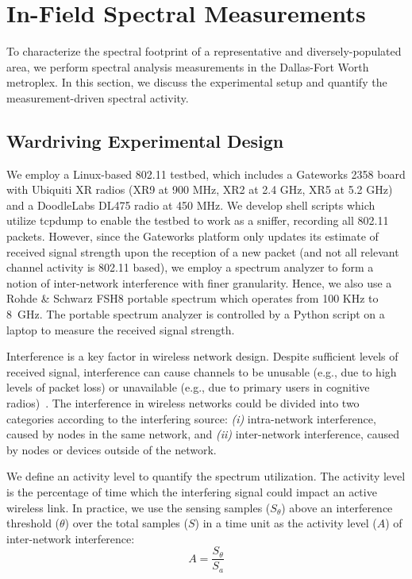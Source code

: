 \section{In-Field Spectral Measurements}
\label{sec:measurements}

To characterize the spectral footprint of a representative and diversely-populated area, 
we perform spectral analysis measurements in the Dallas-Fort Worth metroplex. In this section, 
we discuss the experimental setup and quantify the measurement-driven spectral activity.
 
\subsection{Wardriving Experimental Design}
\label{subsec:measurementdesign}
We employ a Linux-based 802.11 testbed, which includes a Gateworks 2358 board with Ubiquiti XR radios 
(XR9 at 900 MHz, XR2 at 2.4 GHz, XR5 at 5.2 GHz) and a DoodleLabs DL475 radio at 450 MHz. We develop 
shell scripts which utilize tcpdump to enable the testbed to work as a sniffer, recording all 802.11 
packets. However, since the Gateworks platform only updates its estimate of received signal strength 
upon the reception of a new packet (and not all relevant channel activity is 802.11 based), we employ 
a spectrum analyzer to form a notion of inter-network interference with finer granularity.  Hence, we 
also use a Rohde \& Schwarz FSH8 portable spectrum which operates from 100 KHz to 8~GHz. The portable spectrum 
analyzer is controlled by a Python script on a laptop to measure the received signal strength.


Interference is a key factor in wireless network design. Despite sufficient levels of received signal, 
interference can cause channels to be unusable (e.g., due to high levels of packet loss) or unavailable 
(e.g., due to primary users in cognitive radios)~\cite{haykin2005cognitive}. 
The interference in wireless networks could be divided into two categories according to the interfering 
source: {\it (i)} intra-network interference, caused by nodes in the same network, and {\it (ii)} 
inter-network interference, caused by nodes or devices outside of the network. 

We define an activity level to quantify the spectrum utilization. The activity level is the percentage 
of time which the interfering signal could impact an active wireless link. In practice, we use the sensing 
samples ($S_\theta$) above an interference threshold ($\theta$) over the total samples ($S$) in a time 
unit as the activity level ($A$) of inter-network interference:
\begin{equation}
\label{eq:actdef}
A=\frac{S_\theta}{S_a}
\end{equation}



